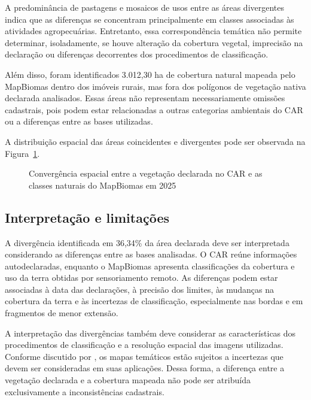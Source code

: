 A predominância de pastagens e mosaicos de usos entre as áreas divergentes indica que as diferenças se concentram principalmente em classes associadas às atividades agropecuárias. Entretanto, essa correspondência temática não permite determinar, isoladamente, se houve alteração da cobertura vegetal, imprecisão na declaração ou diferenças decorrentes dos procedimentos de classificação.

Além disso, foram identificados 3.012,30 ha de cobertura natural mapeada pelo MapBiomas dentro dos imóveis rurais, mas fora dos polígonos de vegetação nativa declarada analisados. Essas áreas não representam necessariamente omissões cadastrais, pois podem estar relacionadas a outras categorias ambientais do CAR ou a diferenças entre as bases utilizadas.

A distribuição espacial das áreas coincidentes e divergentes pode ser observada na Figura~\ref{fig:convergencia}.

\begin{figure}[H]
\centering
\caption{Convergência espacial entre a vegetação declarada no CAR e as classes naturais do MapBiomas em 2025}
\label{fig:convergencia}
\end{figure}

\subsection{Interpretação e limitações}

A divergência identificada em 36,34\% da área declarada deve ser interpretada considerando as diferenças entre as bases analisadas. O CAR reúne informações autodeclaradas, enquanto o MapBiomas apresenta classificações da cobertura e uso da terra obtidas por sensoriamento remoto. As diferenças podem estar associadas à data das declarações, à precisão dos limites, às mudanças na cobertura da terra e às incertezas de classificação, especialmente nas bordas e em fragmentos de menor extensão.

A interpretação das divergências também deve considerar as características dos procedimentos de classificação e a resolução espacial das imagens utilizadas. Conforme discutido por , os mapas temáticos estão sujeitos a incertezas que devem ser consideradas em suas aplicações. Dessa forma, a diferença entre a vegetação declarada e a cobertura mapeada não pode ser atribuída exclusivamente a inconsistências cadastrais.

